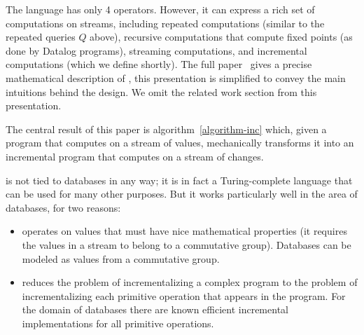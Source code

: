 The \dbsp language has only 4 operators.  However, it can express a
rich set of computations on streams, including repeated computations
(similar to the repeated queries $Q$ above), recursive computations
that compute fixed points (as done by Datalog programs), streaming
computations, and incremental computations (which we define shortly).
The full paper~\cite{budiu-vldb23} gives a precise mathematical
description of \dbsp, this presentation is simplified to convey the
main intuitions behind the design.  We omit the related work section
from this presentation.

The central result of this paper is algorithm~\ref{algorithm-inc}
which, given a \dbsp program that computes on a stream of values,
mechanically transforms it into an incremental \dbsp program that
computes on a stream of changes.

\dbsp is not tied to databases in any way; it is in fact a
Turing-complete language that can be used for many other purposes.
But it works particularly well in the area of databases, for two
reasons:

\begin{itemize}
  \item \dbsp operates on values that must have nice mathematical
    properties (it requires the values in a stream to belong to a
    commutative group).  Databases can be modeled as values from a
    commutative group.
  \item \dbsp reduces the problem of incrementalizing a complex
    program to the problem of incrementalizing each primitive
    operation that appears in the program.  For the domain of
    databases there are known efficient incremental implementations
    for all primitive operations.
\end{itemize}

%

